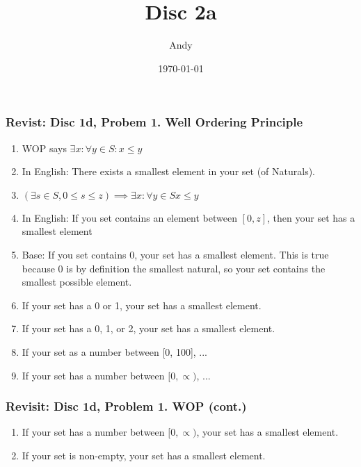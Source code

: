 \documentclass{beamer}
\title{Disc 2a}
\author{Andy}
\institute{UC Berkeley}
\date{\today}
\begin{document}
\begin{frame}
    \titlepage
\end{frame}

\begin{frame}
    \frametitle{Revist: Disc 1d, Probem 1. Well Ordering Principle}

    \begin{enumerate}[<+->]
        \item WOP says $\exists x : \forall y \in S : x \leq y$
        \item In English: There exists a smallest element in your set (of Naturals).
        \item $(\exists s \in S, 0 \leq s \leq z) \implies \exists x : \forall y \in S x \leq y$
        \item In English: If you set contains an element between $[0, z]$, then your set has a smallest
        element
        \item Base: If you set contains 0, your set has a smallest element. This is true because 0 is by
        definition the smallest natural, so your set contains the smallest possible element.
        \item If your set has a 0 or 1, your set has a smallest element.
        \item If your set has a 0, 1, or 2, your set has a smallest element.
        \item If your set as a number between [0, 100], ...
        \item If your set has a number between $[0, \propto)$, ...
    \end{enumerate}

\end{frame}


\begin{frame}
    \frametitle{Revisit: Disc 1d, Problem 1. WOP (cont.)}
    \begin{enumerate}[<+->]
        \item If your set has a number between $[0, \propto)$, your set has a smallest element.
        \item If your set is non-empty, your set has a smallest element.
    \end{enumerate}
\end{frame}
\end{document}
